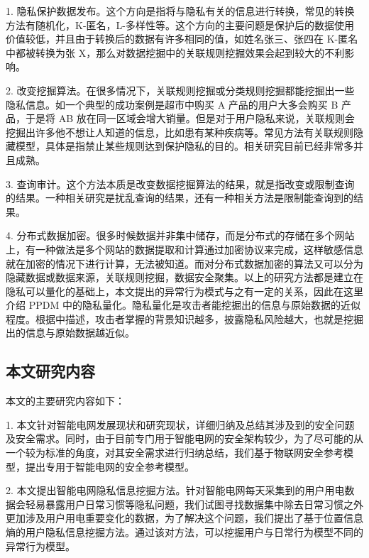 \documentclass[10.5pt,twocolumn]{jbuaa}
\begin{document}
1. 隐私保护数据发布。这个方向是指将与隐私有关的信息进行转换，常见的转换方法有随机化，K-匿名，L-多样性等。这个方向的主要问题是保护后的数据使用价值较低，并且由于转换后的数据有许多相同的值，如姓名张三、张四在 K-匿名中都被转换为张 X，那么对数据挖掘中的关联规则挖掘效果会起到较大的不利影响。

2. 改变挖掘算法。在很多情况下，关联规则挖掘或分类规则挖掘都能挖掘出一些隐私信息。如一个典型的成功案例是超市中购买 A 产品的用户大多会购买 B 产品，于是将 AB 放在同一区域会增大销量。但是对于用户隐私来说，关联规则会挖掘出许多他不想让人知道的信息，比如患有某种疾病等。常见方法有关联规则隐藏模型，具体是指禁止某些规则达到保护隐私的目的。相关研究目前已经非常多并且成熟。

3. 查询审计。这个方法本质是改变数据挖掘算法的结果，就是指改变或限制查询的结果。一种相关研究是扰乱查询的结果，还有一种相关方法是限制能查询到的结果。

4. 分布式数据加密。很多时候数据并非集中储存，而是分布式的存储在多个网站上，有一种做法是多个网站的数据提取和计算通过加密协议来完成，这样敏感信息就在加密的情况下进行计算，无法被知道。而对分布式数据加密的算法又可以分为隐藏数据或数据来源，关联规则挖掘，数据安全聚集。以上的研究方法都是建立在隐私可以量化的基础上，本文提出的异常行为模式与之有一定的关系，因此在这里介绍 PPDM 中的隐私量化。隐私量化是攻击者能挖掘出的信息与原始数据的近似程度。根据中描述，攻击者掌握的背景知识越多，披露隐私风险越大，也就是挖掘出的信息与原始数据越近似。

\subsection{本文研究内容}
本文的主要研究内容如下：

1. 本文针对智能电网发展现状和研究现状，详细归纳及总结其涉及到的安全问题及安全需求。同时，由于目前专门用于智能电网的安全架构较少，为了尽可能的从一个较为标准的角度，对其安全需求进行归纳总结，我们基于物联网安全参考模型，提出专用于智能电网的安全参考模型。

2. 本文提出智能电网隐私信息挖掘方法。针对智能电网每天采集到的用户用电数据会轻易暴露用户日常习惯等隐私问题，我们试图寻找数据集中除去日常习惯之外更加涉及用户用电重要变化的数据，为了解决这个问题，我们提出了基于位置信息熵的用户隐私信息挖掘方法。通过该对方法，可以挖掘用户与日常行为模型不同的异常行为模型。
\end{document}
